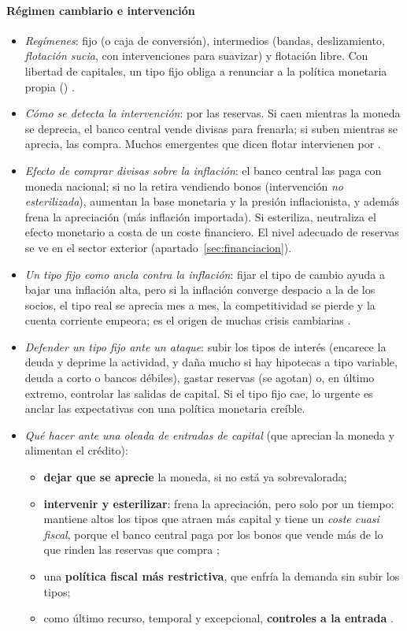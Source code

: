 \documentclass[11pt]{article}
\begin{document}
\paragraph{Régimen cambiario e intervención}
\begin{itemize}
\item \emph{Regímenes}: fijo (o caja de conversión), intermedios (bandas, deslizamiento, \emph{flotación sucia}, con intervenciones para suavizar) y flotación libre. Con libertad de capitales, un tipo fijo obliga a renunciar a la política monetaria propia () .
\item \emph{Cómo se detecta la intervención}: por las reservas. Si caen mientras la moneda se deprecia, el banco central vende divisas para frenarla; si suben mientras se aprecia, las compra. Muchos emergentes que dicen flotar intervienen por  \parencite{CalvoReinhart2002}.
\item \emph{Efecto de comprar divisas sobre la inflación}: el banco central las paga con moneda nacional; si no la retira vendiendo bonos (intervención \emph{no esterilizada}), aumentan la base monetaria y la presión inflacionista, y además frena la apreciación (más inflación importada). Si esteriliza, neutraliza el efecto monetario a costa de un coste financiero. El nivel adecuado de reservas se ve en el sector exterior (apartado~\ref{sec:financiacion}).
\item \emph{Un tipo fijo como ancla contra la inflación}: fijar el tipo de cambio ayuda a bajar una inflación alta, pero si la inflación converge despacio a la de los socios, el tipo real se aprecia mes a mes, la competitividad se pierde y la cuenta corriente empeora; es el origen de muchas crisis cambiarias \parencite{KrugmanObstfeldMelitz2018}.
\item \emph{Defender un tipo fijo ante un ataque}: subir los tipos de interés (encarece la deuda y deprime la actividad, y daña mucho si hay hipotecas a tipo variable, deuda a corto o bancos débiles), gastar reservas (se agotan) o, en último extremo, controlar las salidas de capital. Si el tipo fijo cae, lo urgente es anclar las expectativas con una política monetaria creíble.
\item \emph{Qué hacer ante una oleada de entradas de capital} (que aprecian la moneda y alimentan el crédito):
  \begin{itemize}
  \item \textbf{dejar que se aprecie} la moneda, si no está ya sobrevalorada;
  \item \textbf{intervenir y esterilizar}: frena la apreciación, pero solo por un tiempo: mantiene altos los tipos que atraen más capital y tiene un \emph{coste cuasi fiscal}, porque el banco central paga por los bonos que vende más de lo que rinden las reservas que compra \parencite{Calvo1991Esterilizacion};
  \item una \textbf{política fiscal más restrictiva}, que enfría la demanda sin subir los tipos;
  \item como último recurso, temporal y excepcional, \textbf{controles a la entrada} \parencite{FMI2012VisionInstitucional}.
  \end{itemize}
\end{itemize}
\end{document}
